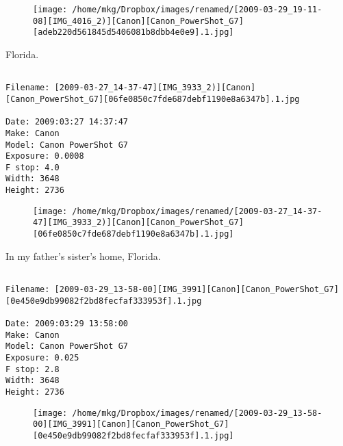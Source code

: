 \begin{figure}
\texttt{[image: /home/mkg/Dropbox/images/renamed/[2009-03-29\_19-11-08][IMG\_4016\_2)][Canon][Canon\_PowerShot\_G7][adeb220d561845d5406081b8dbb4e0e9].1.jpg]}
\end{figure}
    
\clearpage
\onecolumn
\noindent Florida.
\noindent
\begin{lstlisting}

Filename: [2009-03-27_14-37-47][IMG_3933_2)][Canon][Canon_PowerShot_G7][06fe0850c7fde687debf1190e8a6347b].1.jpg

Date: 2009:03:27 14:37:47
Make: Canon
Model: Canon PowerShot G7
Exposure: 0.0008
F stop: 4.0
Width: 3648
Height: 2736
\end{lstlisting}
\clearpage

\begin{figure}
\texttt{[image: /home/mkg/Dropbox/images/renamed/[2009-03-27\_14-37-47][IMG\_3933\_2)][Canon][Canon\_PowerShot\_G7][06fe0850c7fde687debf1190e8a6347b].1.jpg]}
\end{figure}
    
\clearpage
\onecolumn
\noindent In my father's sister's home, Florida.
\noindent
\begin{lstlisting}

Filename: [2009-03-29_13-58-00][IMG_3991][Canon][Canon_PowerShot_G7][0e450e9db99082f2bd8fecfaf333953f].1.jpg

Date: 2009:03:29 13:58:00
Make: Canon
Model: Canon PowerShot G7
Exposure: 0.025
F stop: 2.8
Width: 3648
Height: 2736
\end{lstlisting}
\clearpage

\begin{figure}
\texttt{[image: /home/mkg/Dropbox/images/renamed/[2009-03-29\_13-58-00][IMG\_3991][Canon][Canon\_PowerShot\_G7][0e450e9db99082f2bd8fecfaf333953f].1.jpg]}
\end{figure}
    
